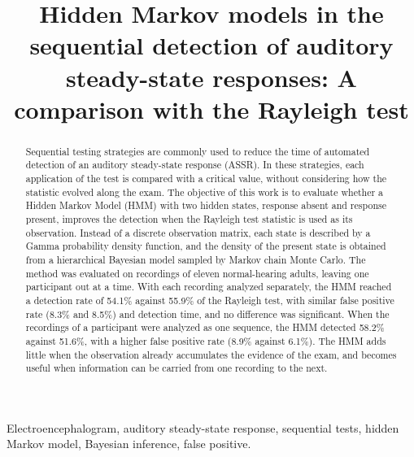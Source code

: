\documentclass[conference]{IEEEtran}
\begin{document}
\title{Hidden Markov models in the sequential detection of auditory steady-state responses: A comparison with the Rayleigh test}

\author{
}

\maketitle

\begin{abstract}
Sequential testing strategies are commonly used to reduce the time of automated detection of an auditory steady-state response (ASSR). In these strategies, each application of the test is compared with a critical value, without considering how the statistic evolved along the exam. The objective of this work is to evaluate whether a Hidden Markov Model (HMM) with two hidden states, response absent and response present, improves the detection when the Rayleigh test statistic is used as its observation. Instead of a discrete observation matrix, each state is described by a Gamma probability density function, and the density of the present state is obtained from a hierarchical Bayesian model sampled by Markov chain Monte Carlo. The method was evaluated on recordings of eleven normal-hearing adults, leaving one participant out at a time. With each recording analyzed separately, the HMM reached a detection rate of 54.1\% against 55.9\% of the Rayleigh test, with similar false positive rate (8.3\% and 8.5\%) and detection time, and no difference was significant. When the recordings of a participant were analyzed as one sequence, the HMM detected 58.2\% against 51.6\%, with a higher false positive rate (8.9\% against 6.1\%). The HMM adds little when the observation already accumulates the evidence of the exam, and becomes useful when information can be carried from one recording to the next.
\end{abstract}

\begin{IEEEkeywords}
Electroencephalogram, auditory steady-state response, sequential tests, hidden Markov model, Bayesian inference, false positive.
\end{IEEEkeywords}
\end{document}

